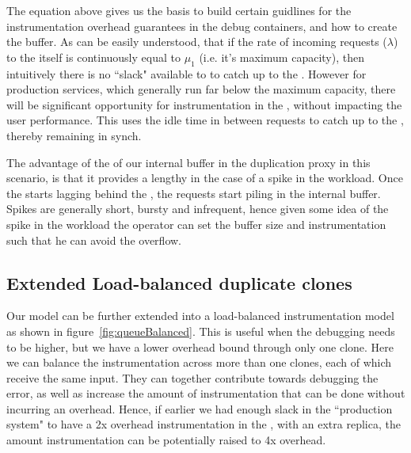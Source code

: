 The equation above gives us the basis to build certain guidlines for the instrumentation overhead guarantees in the debug containers, and how to create the buffer. 
As can be easily understood, that if the rate of incoming requests ($\lambda$) to the \productioncontainer itself is continuously equal to $\mu_{1}$ (i.e. it's maximum capacity), then intuitively there is no ``slack" available to \debugcontainer to catch up to the \productioncontainer. 
However for production services, which generally run far below the maximum capacity, there will be significant opportunity for instrumentation in the \debugcontainer, without impacting the user performance.
This \debugcontainer uses the idle time in between requests to catch up to the \productioncontainer, thereby remaining in synch.

The advantage of the of our internal buffer in the duplication proxy in this scenario, is that it provides a lengthy \debugwindow in the case of a spike in the workload.
Once the \debugcontainer starts lagging behind the \productioncontainer, the requests start piling in the internal buffer. 
Spikes are generally short, bursty and infrequent, hence given some idea of the spike in the workload the operator can set the buffer size and instrumentation such that he can avoid the overflow.


\subsection{Extended Load-balanced duplicate clones}

Our model can be further extended into a load-balanced instrumentation model as shown in figure~\ref{fig:queueBalanced}. 
This is useful when the debugging needs to be higher, but we have a lower overhead bound through only one clone.
Here we can balance the instrumentation across more than one clones, each of which receive the same input.
They can together contribute towards debugging the error, as well as increase the amount of instrumentation that can be done without incurring an overhead.
Hence, if earlier we had enough slack in the ``production system" to have a 2x overhead instrumentation in the \debugcontainer, with an extra replica, the amount instrumentation can be potentially raised to 4x overhead.

